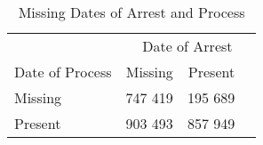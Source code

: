 \begin{table}[t]

\caption{\label{tab:missing_date_of_arrest_process}Missing Dates of Arrest and Process}
\centering
\begin{tabular}{lrr}
\toprule
\multicolumn{1}{c}{ } & \multicolumn{3}{c}{Date of Arrest} \\
\cmidrule(l{2pt}r{2pt}){2-4}
Date of Process & Missing & Present\\
\midrule
Missing & 747 419 & 195 689\\
Present & 903 493 & 857 949\\
\bottomrule
\end{tabular}
\end{table}